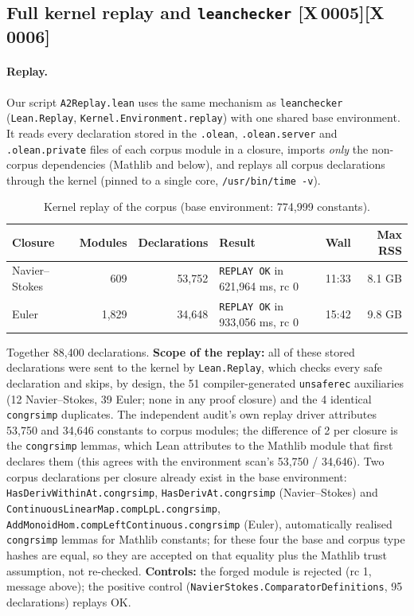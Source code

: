 \documentclass[10pt]{article}
\newcommand{\tg}[2]{\texorpdfstring{\textsf{[#1\,#2]}}{}}  %
\newcommand{\lean}[1]{\texttt{#1}}
\renewcommand{\_}{\textunderscore\allowbreak}
\begin{document}
\subsection{Full kernel replay and \texttt{leanchecker} \tg{X}{0005}\tg{X}{0006}}\label{sec:replay}
\paragraph{Replay.} Our script \texttt{A2Replay.lean} uses the same mechanism as \texttt{leanchecker} (\lean{Lean.Replay}, \lean{Kernel.Environment.replay}) with one shared base environment. It reads every declaration stored in the \texttt{.olean}, \texttt{.olean.server} and \texttt{.olean.private} files of each corpus module
in a closure, imports \emph{only} the non-corpus dependencies (Mathlib and below), and replays all corpus declarations through the kernel (pinned to a single core, \texttt{/usr/bin/time -v}).
\begin{table}[ht]\centering\small
\begin{tabular}{@{}lrrlrr@{}}
\toprule
Closure & Modules & Declarations & Result & Wall & Max RSS \\ \midrule
Navier--Stokes & 609 & 53,752 & \texttt{REPLAY OK} in 621,964 ms, rc 0 & 11:33 & 8.1 GB \\
Euler & 1,829 & 34,648 & \texttt{REPLAY OK} in 933,056 ms, rc 0 & 15:42 & 9.8 GB \\ \bottomrule
\end{tabular}
\caption{Kernel replay of the corpus (base environment: 774,999 constants).}
\end{table}
Together 88,400 declarations. \textbf{Scope of the replay:} all of these stored declarations were sent to the kernel by \lean{Lean.Replay}, which checks every safe declaration and skips, by design, the 51 compiler-generated \lean{\_unsafe\_rec} auxiliaries (12 Navier--Stokes, 39 Euler; none in any proof closure) and the 4 identical \lean{congr\_simp} duplicates. The independent audit's own replay driver attributes 53,750 and 34,646 constants to corpus modules; the difference of 2 per closure is the \lean{congr\_simp} lemmas, which Lean attributes to the Mathlib module that first declares them (this agrees with the environment scan's 53,750 / 34,646). Two corpus declarations per closure already exist in the base environment: \lean{HasDerivWithinAt.congr\_simp}, \lean{HasDerivAt.congr\_simp} (Navier--Stokes) and \lean{ContinuousLinearMap.compLpL.congr\_simp}, \lean{AddMonoidHom.compLeftContinuous.congr\_simp} (Euler), automatically realised
\lean{congr\_simp} lemmas for Mathlib constants; for these four the base and corpus type hashes are equal, so they are accepted on that equality plus the Mathlib trust assumption, not re-checked. \textbf{Controls:} the forged module is rejected (rc 1, message above); the positive control (\lean{NavierStokes.ComparatorDefinitions}, 95 declarations) replays OK.
\end{document}

